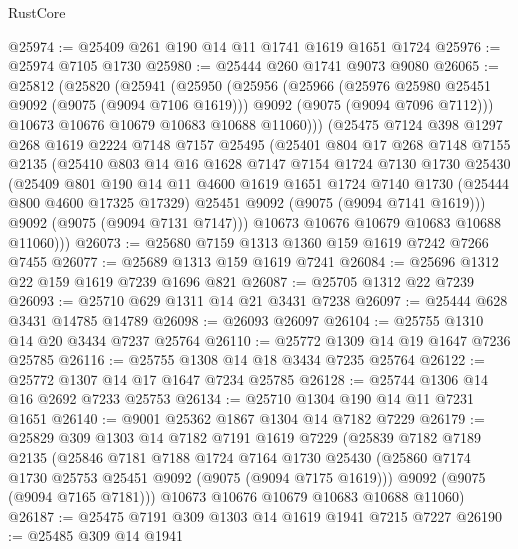 \begin{lexlean}{RustCore}
\begin{coremodule}
@25974 := @25409 @261 @190 @14 @11 @1741 @1619 @1651 @1724
@25976 := @25974 @7105 @1730
@25980 := @25444 @260 @1741 @9073 @9080
@26065 := @25812
    (@25820
      (@25941
        (@25950
          (@25956
            (@25966
              (@25976 @25980 @25451 @9092 (@9075 (@9094 @7106 @1619)))
              @9092
              (@9075 (@9094 @7096 @7112)))
            @10673
            @10676
            @10679
            @10683
            @10688
            @11060)))
      (@25475
        @7124
        @398
        @1297
        @268
        @1619
        @2224
        @7148
        @7157
        @25495
        (@25401
          @804
          @17
          @268
          @7148
          @7155
          @2135
          (@25410
            @803
            @14
            @16
            @1628
            @7147
            @7154
            @1724
            @7130
            @1730
            @25430
            (@25409
              @801
              @190
              @14
              @11
              @4600
              @1619
              @1651
              @1724
              @7140
              @1730
              (@25444 @800 @4600 @17325 @17329)
              @25451
              @9092
              (@9075 (@9094 @7141 @1619)))
            @9092
            (@9075 (@9094 @7131 @7147)))
          @10673
          @10676
          @10679
          @10683
          @10688
          @11060)))
@26073 := @25680 @7159 @1313 @1360 @159 @1619 @7242 @7266 @7455
@26077 := @25689 @1313 @159 @1619 @7241
@26084 := @25696 @1312 @22 @159 @1619 @7239 @1696 @821
@26087 := @25705 @1312 @22 @7239
@26093 := @25710 @629 @1311 @14 @21 @3431 @7238
@26097 := @25444 @628 @3431 @14785 @14789
@26098 := @26093 @26097
@26104 := @25755 @1310 @14 @20 @3434 @7237 @25764
@26110 := @25772 @1309 @14 @19 @1647 @7236 @25785
@26116 := @25755 @1308 @14 @18 @3434 @7235 @25764
@26122 := @25772 @1307 @14 @17 @1647 @7234 @25785
@26128 := @25744 @1306 @14 @16 @2692 @7233 @25753
@26134 := @25710 @1304 @190 @14 @11 @7231 @1651
@26140 := @9001 @25362 @1867 @1304 @14 @7182 @7229
@26179 := @25829
    @309
    @1303
    @14
    @7182
    @7191
    @1619
    @7229
    (@25839
      @7182
      @7189
      @2135
      (@25846
        @7181
        @7188
        @1724
        @7164
        @1730
        @25430
        (@25860 @7174 @1730 @25753 @25451 @9092 (@9075 (@9094 @7175 @1619)))
        @9092
        (@9075 (@9094 @7165 @7181)))
      @10673
      @10676
      @10679
      @10683
      @10688
      @11060)
@26187 := @25475 @7191 @309 @1303 @14 @1619 @1941 @7215 @7227
@26190 := @25485 @309 @14 @1941

\end{coremodule}
\end{lexlean}
